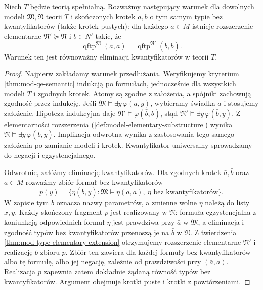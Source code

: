 \begin{twierdzenie}
\label{thm:mod-qe-forth}
Niech $T$ będzie teorią spełnialną. Rozważmy następujący
warunek dla dowolnych modeli $\mathfrak M,\mathfrak N$
teorii $T$ i skończonych krotek $\bar a,\bar b$ o tym
samym typie bez kwantyfikatorów (także krotek pustych):
dla każdego $a\in M$ istnieje rozszerzenie elementarne
$\mathfrak N'\succeq\mathfrak N$ i $b\in N'$ takie, że
\[
\operatorname{qftp}^{\mathfrak M}(\bar a,a)=
\operatorname{qftp}^{\mathfrak N'}(\bar b,b).
\]
Warunek ten jest równoważny eliminacji kwantyfikatorów
w teorii $T$.
\end{twierdzenie}
\begin{proof}
Najpierw zakładamy warunek przedłużania.
Weryfikujemy kryterium \ref{thm:mod-qe-semantic}
indukcją po formułach, jednocześnie dla wszystkich
modeli $T$ i zgodnych krotek. Atomy są zgodne z założenia,
a spójniki zachowują zgodność przez indukcję.
Jeśli $\mathfrak M\models\exists y\,\varphi(\bar a,y)$,
wybieramy świadka $a$ i stosujemy założenie.
Hipoteza indukcyjna daje
$\mathfrak N'\models\varphi(\bar b,b)$, stąd
$\mathfrak N'\models\exists y\,\varphi(\bar b,y)$.
Z elementarności rozszerzenia
(\ref{def:model-elementary-substructure})
wynika $\mathfrak N\models\exists y\,\varphi(\bar b,y)$.
Implikacja odwrotna wynika z zastosowania tego samego
założenia po zamianie modeli i krotek. Kwantyfikator
uniwersalny sprowadzamy do negacji i egzystencjalnego.

Odwrotnie, załóżmy eliminację kwantyfikatorów.
Dla zgodnych krotek $\bar a,\bar b$ oraz $a\in M$
rozważmy zbiór formuł bez kwantyfikatorów
\[
p(y)=\{\eta(\bar b,y):
 \mathfrak M\models\eta(\bar a,a),\
 \eta\text{ bez kwantyfikatorów}\}.
\]
W zapisie tym $\bar b$ oznacza nazwy parametrów,
a zmienne wolne $\eta$ należą do listy $\bar x,y$.
Każdy skończony fragment $p$ jest realizowany
w $\mathfrak N$: formuła egzystencjalna z koniunkcją
odpowiednich formuł $\eta$ jest prawdziwa przy $\bar a$
w $\mathfrak M$, a eliminacja i zgodność typów bez
kwantyfikatorów przenoszą je na $\bar b$ w $\mathfrak N$.
Z twierdzenia \ref{thm:mod-type-elementary-extension}
otrzymujemy rozszerzenie elementarne $\mathfrak N'$
i realizację $b$ zbioru $p$. Zbiór ten zawiera dla
każdej formuły bez kwantyfikatorów albo tę formułę,
albo jej negację, zależnie od prawdziwości przy
$(\bar a,a)$. Realizacja $p$ zapewnia zatem dokładnie
żądaną równość typów bez kwantyfikatorów.
Argument obejmuje krotki puste i krotki z powtórzeniami.
\end{proof}

